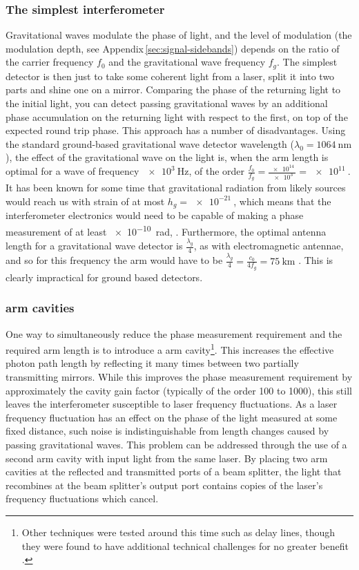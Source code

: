 \subsubsection{The simplest interferometer}
Gravitational waves modulate the phase of light, and the level of modulation (the modulation depth, see Appendix\,\ref{sec:signal-sidebands}) depends on the ratio of the carrier frequency $f_0$ and the gravitational wave frequency $f_g$. The simplest detector is then just to take some coherent light from a laser, split it into two parts and shine one on a mirror. Comparing the phase of the returning light to the initial light, you can detect passing gravitational waves by an additional phase accumulation on the returning light with respect to the first, on top of the expected round trip phase. This approach has a number of disadvantages. Using the standard ground-based gravitational wave detector wavelength ($\lambda_0 = \SI{1064}{\nano\meter}$), the effect of the gravitational wave on the light is, when the arm length is optimal for a wave of frequency $\SI{e3}{\hertz}$, of the order $\frac{f_0}{f_g} = \frac{\SI{e14}{}}{\SI{e3}{}} = \SI{e11}{}$. It has been known for some time  that gravitational radiation from likely sources would reach us with strain of at most $h_g = \SI{e-21}{}$, which means that the interferometer electronics would need to be capable of making a phase measurement of at least \SI{e-10}{\radian}, . Furthermore, the optimal antenna length for a gravitational wave detector is $\frac{\lambda_g}{4}$, as with electromagnetic antennae, and so for this frequency the arm would have to be $\frac{\lambda_g}{4} = \frac{c_0}{4 f_g} = \SI{75}{\kilo\meter}$ \cite{Abbott2016a}. This is clearly impractical for ground based detectors.

\subsubsection{\FP{} arm cavities}
One way to simultaneously reduce the phase measurement requirement and the required arm length is to introduce a \FP{} arm cavity\footnote{Other techniques were tested around this time such as delay lines, though they were found to have additional technical challenges for no greater benefit .}. This increases the effective photon path length by reflecting it many times between two partially transmitting mirrors. While this improves the phase measurement requirement by approximately the cavity gain factor (typically of the order \num{100} to \num{1000}), this still leaves the interferometer susceptible to laser frequency fluctuations. As a laser frequency fluctuation has an effect on the phase of the light measured at some fixed distance, such noise is indistinguishable from length changes caused by passing gravitational waves. This problem can be addressed through the use of a second \FP{} arm cavity with input light from the same laser. By placing two arm cavities at the reflected and transmitted ports of a beam splitter, the light that recombines at the beam splitter's output port contains  copies of the laser's frequency fluctuations which cancel.

